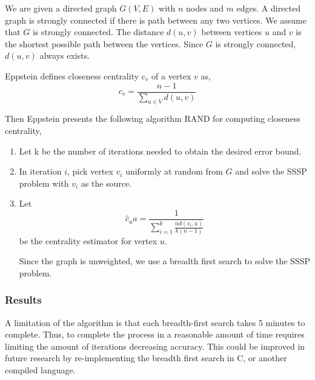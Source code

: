 \documentclass{article}
\begin{document}
We are given a directed graph $G(V,E)$ with $n$ nodes and $m$ edges.
A directed graph is strongly connected if there is path between any two vertices. We assume that $G$ is strongly connected.
The distance $d(u, v)$ between vertices $u$ and $v$ is the shortest possible path between the vertices. Since $G$ is strongly connected, $d(u, v)$ always exists.


Eppstein defines closeness centrality $c_v$ of a vertex $v$ as,
\begin{equation*}
    c_v = \frac{n-1}{\sum_{u \in V}d(u,v)}
\end{equation*} 

Then Eppstein presents the following algorithm RAND for computing closeness centrality,
\begin{enumerate}[1.]
    \item 
    Let k be the number of iterations needed to obtain the desired error bound.

    \item
    In iteration $i$, pick vertex $v_i$ uniformly at random from $G$ and solve the SSSP problem with $v_i$ as the source.

    \item 
    Let
    \begin{equation*}
        \hat{c}_ua = \frac{1}{\sum^k_{i=1} \frac{n d(v_i, u)}{k(n-1)}}
    \end{equation*}
    be the centrality estimator for vertex $u$.

    Since the graph is unweighted, we use a breadth first search to solve the SSSP problem.

    
\end{enumerate}

\subsubsection*{Results}

A limitation of the algorithm is that each breadth-first search takes 5 minutes to complete. Thus, to complete the process in a reasonable amount of time requires limiting the amount of iterations decreasing accuracy. This could be improved in future research by re-implementing the breadth first search in C, or another compiled language.
\end{document}
